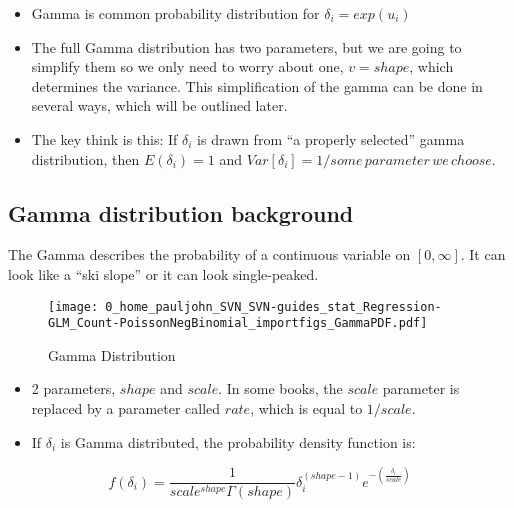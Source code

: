 \documentclass[10pt,english]{beamer}
\def\lyxframeend{} %
\begin{document}
\lyxframeend{}
\begin{itemize}
\item Gamma is common probability distribution for $\delta_{i}=exp(u_{i})$
\item The full Gamma distribution has two parameters, but we are going to
simplify them so we only need to worry about one, $v=shape$, which
determines the variance. This simplification of the gamma can be done
in several ways, which will be outlined later. 
\item The key think is this: If $\delta_{i}$ is drawn from ``a properly
selected'' gamma distribution, then $E(\delta_{i})=1$ and $Var[\delta_{i}]=1/some\, parameter\, we\, choose$.
\end{itemize}

\lyxframeend{}\subsection{Gamma distribution background}


\lyxframeend{}

The Gamma describes the probability of a continuous variable on $[0,\infty].$
It can look like a ``ski slope'' or it can look single-peaked.

\begin{figure}
\begin{centering}
\texttt{[image: 0\_home\_pauljohn\_SVN\_SVN-guides\_stat\_Regression-GLM\_Count-PoissonNegBinomial\_importfigs\_GammaPDF.pdf]}
\par\end{centering}

\caption{Gamma Distribution\label{fig:Gamma-Distribution}}
\end{figure}



\lyxframeend{}
\begin{itemize}
\item 2 parameters, $shape$ and $scale$. In some books, the $scale$ parameter
is replaced by a parameter called $rate$, which is equal to $1/scale$.
\item If $\delta_{i}$ is Gamma distributed, the probability density function
is:
\end{itemize}
\[
f(\delta_{i})=\frac{1}{scale^{shape}\Gamma(shape)}\delta_{i}^{(shape-1)}e^{-(\frac{\delta_{i}}{scale})}
\]
\end{document}
